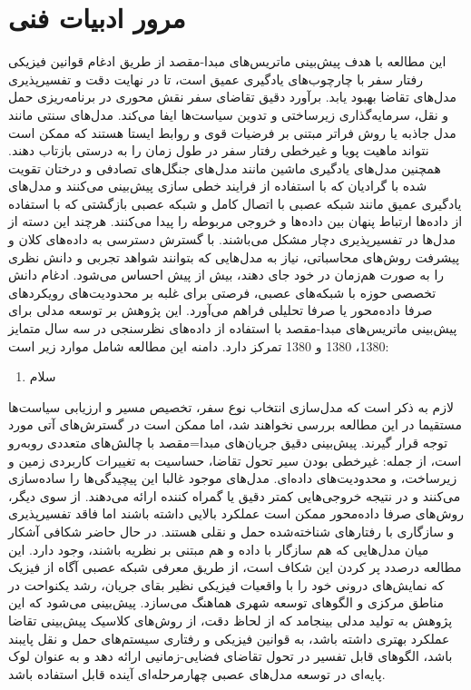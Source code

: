 \documentclass{titlepage}
\begin{document}
\section{مرور ادبیات فنی}
این مطالعه با هدف پیش‌بینی ماتریس‌های مبدا-مقصد از طریق ادغام قوانین فیزیکی رفتار سفر با چارچوب‌های یادگیری عمیق است، تا در نهایت دقت و تفسیرپذیری مدل‌های تقاضا بهبود یابد. برآورد دقیق تقاضای سفر نقش محوری در برنامه‌ریزی حمل و نقل، سرمایه‌گذاری زیرساختی و تدوین سیاست‌ها ایفا می‌کند. مدل‌های سنتی مانند مدل جاذبه یا روش فراتر  مبتنی بر فرضیات قوی و روابط ایستا هستند که ممکن است نتواند ماهیت پویا و غیرخطی رفتار سفر در طول زمان را به درستی بازتاب دهند. همچنین مدل‌های یادگیری ماشین مانند مدل‌های جنگل‌های تصادفی  و درختان تقویت شده با گرادیان   که با استفاده از فرایند خطی سازی پیش‌بینی می‌کنند و مدل‌های یادگیری عمیق مانند شبکه عصبی با اتصال کامل و شبکه عصبی بازگشتی که با استفاده از داده‌ها ارتباط پنهان بین داده‌ها و خروجی مربوطه را پیدا می‌کنند. هرچند این دسته از مدل‌ها در تفسیرپذیری دچار مشکل می‌باشند. با گسترش دسترسی به داده‌های کلان و پیشرفت روش‌های محاسباتی، نیاز به مدل‌هایی که بتوانند شواهد تجربی و دانش نظری را به صورت هم‌زمان در خود جای دهند، بیش از پیش احساس می‌شود. ادغام دانش تخصصی حوزه با شبکه‌های عصبی، فرصتی برای غلبه بر محدودیت‌های رویکردهای صرفا داده‌محور یا صرفا تحلیلی فراهم می‌آورد.
این پژوهش بر توسعه مدلی برای پیش‌بینی ماتریس‌های مبدا-مقصد با استفاده از داده‌های نظرسنجی در سه سال متمایز 1380، 1380 و 1380 تمرکز دارد. دامنه این مطالعه شامل موارد زیر است:
\begin{enumerate}
    \item سلام
\end{enumerate}
لازم به ذکر است که مدل‌سازی انتخاب نوع سفر، تخصیص مسیر و ارزیابی سیاست‌ها مستقیما در این مطالعه بررسی نخواهند شد، اما ممکن است در گسترش‌های آتی مورد توجه قرار گیرند.
پیش‌بینی دقیق جریان‌های مبدا=مقصد با چالش‌های متعددی روبه‌رو است، از جمله: غیرخطی بودن سیر تحول تقاضا، حساسیت به تغییرات کاربردی زمین و زیرساخت، و محدودیت‌های داده‌ای. مدل‌های موجود غالبا این پیچیدگی‌ها را ساده‌سازی می‌کنند و در نتیجه خروجی‌هایی کمتر دقیق یا گمراه کننده ارائه می‌دهند. از سوی دیگر، روش‌های صرفا داده‌محور ممکن است عملکرد بالایی داشته باشند اما فاقد تفسیرپذیری و سازگاری با رفتارهای شناخته‌شده حمل و نقلی هستند. در حال حاضر شکافی آشکار میان مدل‌هایی که هم سازگار با داده و هم مبتنی بر نظریه باشند، وجود دارد. این مطالعه درصدد پر کردن این شکاف است، از طریق معرفی شبکه عصبی آگاه از فیزیک که نمایش‌های درونی خود را با واقعیات فیزیکی نظیر بقای جریان، رشد یکنواحت در مناطق مرکزی و الگوهای توسعه شهری هماهنگ می‌سازد.
پیش‌بینی می‌شود که این پژوهش به تولید مدلی بینجامد که از لحاظ دقت، از روش‌های کلاسیک پیش‌بینی تقاضا عملکرد بهتری داشته باشد، به قوانین فیزیکی و رفتاری سیستم‌های حمل و نقل پایبند باشد، الگوهای قابل تفسیر در تحول تقاضای فضایی-زمانیی ارائه دهد و به عنوان لوک پایه‌ای در توسعه مدل‌های عصبی چهارمرحله‌ای آینده قابل استفاده باشد.
\end{document}
